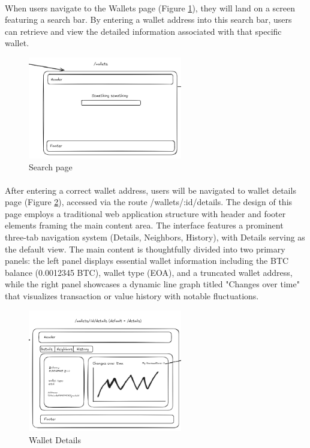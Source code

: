 \paragraph{}When users navigate to the Wallets page (Figure \ref{fig:search}), they will land on a screen featuring a search bar. By entering a wallet address into this search bar, users can retrieve and view the detailed information associated with that specific wallet.
\begin{figure}[h]
    \centering
    \includegraphics[width= 0.6\textwidth, keepaspectratio]{root/search.png}
     \caption{Search page}
    \label{fig:search}
\end{figure}
\paragraph{}After entering a correct wallet address, users will be navigated to wallet details page (Figure \ref{fig:Wallet_Detail}), accessed via the route /wallets/:id/details. The design of this page employs a traditional web application structure with header and footer elements framing the main content area. The interface features a prominent three-tab navigation system (Details, Neighbors, History), with Details serving as the default view. The main content is thoughtfully divided into two primary panels: the left panel displays essential wallet information including the BTC balance (0.0012345 BTC), wallet type (EOA), and a truncated wallet address, while the right panel showcases a dynamic line graph titled "Changes over time" that visualizes transaction or value history with notable fluctuations.
\begin{figure}[h]
    \centering
    \includegraphics[width= 0.6\textwidth, keepaspectratio]{root/wallet_wallets.png}
     \caption{Wallet Details}
    \label{fig:Wallet_Detail}
\end{figure}
